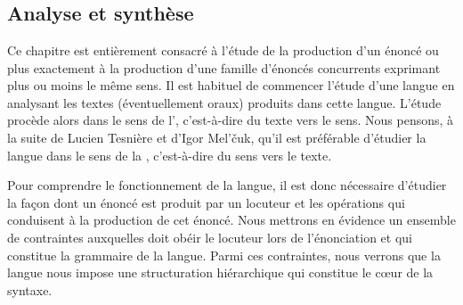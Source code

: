 \chapter{}\label{sec:1.2}

\section{Analyse et synthèse}\label{sec:1.2.0}

Ce chapitre est entièrement consacré à l’étude de la production d’un énoncé ou plus exactement à la production d’une famille d’énoncés concurrents exprimant plus ou moins le même sens. Il est habituel de commencer l’étude d’une langue en analysant les textes (éventuellement oraux) produits dans cette langue. L’étude procède alors dans le sens de l’, c’est-à-dire du texte vers le sens. Nous pensons, à la suite de Lucien Tesnière et d’Igor Mel’čuk, qu’il est préférable d’étudier la langue dans le sens de la , c’est-à-dire du sens vers le texte.

Pour comprendre le fonctionnement de la langue, il est donc nécessaire d’étudier la façon dont un énoncé est produit par un locuteur et les opérations qui conduisent à la production de cet énoncé. Nous mettrons en évidence un ensemble de contraintes auxquelles doit obéir le locuteur lors de l’énonciation et qui constitue la grammaire de la langue. Parmi ces contraintes, nous verrons que la langue nous impose une structuration hiérarchique qui constitue le cœur de la syntaxe.


